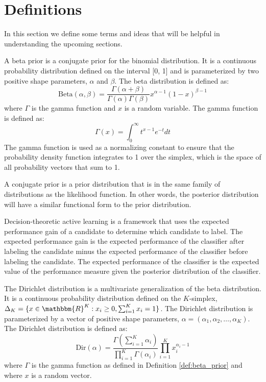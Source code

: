 \chapter*{Definitions}

In this section we define some terms and ideas that will be helpful in understanding the upcoming sections.

\begin{defn}
\label{def:beta_prior}
A beta prior is a conjugate prior for the binomial distribution. It is a continuous probability distribution defined on the interval [0, 1] and is parameterized by two positive shape parameters, \(\alpha\) and \(\beta\). The beta distribution is defined as: 
\[\text{Beta}(\alpha, \beta) = \frac{\Gamma(\alpha + \beta)}{\Gamma(\alpha)\Gamma(\beta)}x^{\alpha - 1}(1 - x)^{\beta - 1}\]
where \(\Gamma\) is the gamma function and \(x\) is a random variable. The gamma function is defined as:
\[\Gamma(x) = \int_0^\infty t^{x - 1}e^{-t}dt\]
The gamma function is used as a normalizing constant to ensure that the probability density function integrates to 1 over the simplex, which is the space of all probability vectors that sum to 1.
\end{defn}

\begin{defn}
\label{def:conjugate_prior}
A conjugate prior is a prior distribution that is in the same family of distributions as the likelihood function. In other words, the posterior distribution will have a similar functional form to the prior distribution.
\end{defn}

\begin{defn}
\label{def:decision_theoretic}
Decision-theoretic active learning is a framework that uses the expected performance gain of a candidate to determine which candidate to label. The expected performance gain is the expected performance of the classifier after labeling the candidate minus the expected performance of the classifier before labeling the candidate. The expected performance of the classifier is the expected value of the performance measure given the posterior distribution of the classifier.
\end{defn}

\begin{defn}
\label{def:dirichlet_distribution}
The Dirichlet distribution is a multivariate generalization of the beta distribution. It is a continuous probability distribution defined on the \(K\)-simplex, \(\Delta_K = \{x \in \mathbbm{R}^K : x_i \geq 0, \sum_{i=1}^K x_i = 1\}\). The Dirichlet distribution is parameterized by a vector of positive shape parameters, \(\alpha = (\alpha_1, \alpha_2, \dots, \alpha_K)\). The Dirichlet distribution is defined as:
\[\text{Dir}(\alpha) = \frac{\Gamma(\sum_{i=1}^K \alpha_i)}{\prod_{i=1}^K \Gamma(\alpha_i)}\prod_{i=1}^K x_i^{\alpha_i - 1}\]
where \(\Gamma\) is the gamma function as defined in Definition \ref{def:beta_prior} and where \(x\) is a random vector.
\end{defn}

